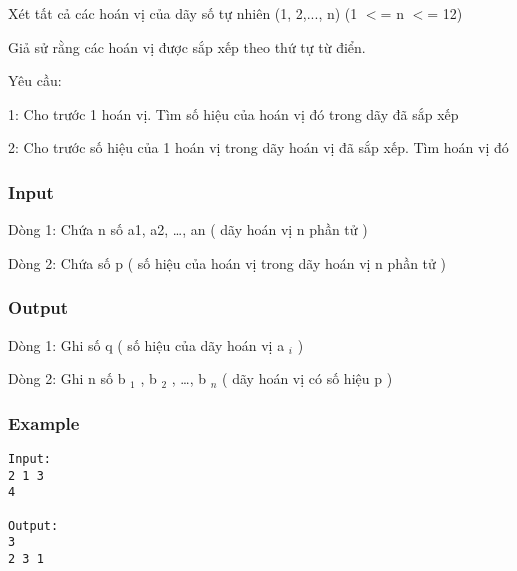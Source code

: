 



   Xét tất cả các hoán vị của dãy số tự nhiên (1, 2,..., n) (1 $<$= n $<$= 12)  

   Giả sử rằng các hoán vị được sắp xếp theo thứ tự từ điển.  

   Yêu cầu:  

   1: Cho trước 1 hoán vị. Tìm số hiệu của hoán vị đó trong dãy đã sắp xếp  

   2: Cho trước số hiệu của 1 hoán vị trong dãy hoán vị đã sắp xếp. Tìm hoán vị đó  

\subsubsection{   Input  }

   Dòng 1: Chứa n số a1, a2, …, an ( dãy hoán vị n phần tử )  

   Dòng 2: Chứa số p ( số hiệu của hoán vị trong dãy hoán vị n phần tử )  

\subsubsection{   Output  }

   Dòng 1: Ghi số q ( số hiệu của dãy hoán vị a   $_    i   $   )  

   Dòng 2: Ghi n số b   $_    1   $   , b   $_    2   $   , …, b   $_    n   $   ( dãy hoán vị có số hiệu p )  

\subsubsection{   Example  }
\begin{verbatim}
Input:
2 1 3
4

Output:
3
2 3 1 

\end{verbatim}